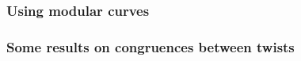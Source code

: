 \documentclass[compress]{beamer}
\begin{document}
\begin{frame}\frametitle{}
\end{frame}

\begin{frame}\frametitle{}
\end{frame}

\begin{frame}\frametitle{}
\end{frame}

\begin{frame}\frametitle{}
\end{frame}

\begin{frame}\frametitle{Using modular curves} %
\end{frame}

\begin{frame}\frametitle{Some results on congruences between twists}
\end{frame}
\end{document}
